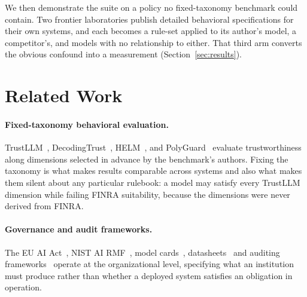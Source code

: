 \documentclass{article}
\begin{document}
We then demonstrate the suite on a policy no fixed-taxonomy benchmark could contain. Two
frontier laboratories publish detailed behavioral specifications for their own systems, and each
becomes a rule-set applied to its author's model, a competitor's, and models with no
relationship to either. That third arm converts the obvious confound into a measurement
(Section~\ref{sec:results}).

\section{Related Work}
\label{sec:related}

\paragraph{Fixed-taxonomy behavioral evaluation.}
TrustLLM~\cite{sun2024trustllm}, DecodingTrust~\cite{wang2023decodingtrust}, HELM~\cite{liang2023helm}, and PolyGuard~\cite{polyguard2025} evaluate trustworthiness along dimensions selected in advance by the benchmark's authors. Fixing the taxonomy is what makes results comparable across systems and also what makes them silent about any particular rulebook: a model may satisfy every TrustLLM dimension while failing FINRA suitability, because the dimensions were never derived from FINRA.

\paragraph{Governance and audit frameworks.}
The EU AI Act~\cite{euaiact2024}, NIST AI RMF~\cite{nist2023rmf}, model cards~\cite{mitchell2019model}, datasheets~\cite{gebru2021datasheets} and auditing frameworks~\cite{raji2020closing,mokander2023auditing} operate at the organizational level, specifying what an institution must produce rather than whether a deployed system satisfies an obligation in operation.
\end{document}
